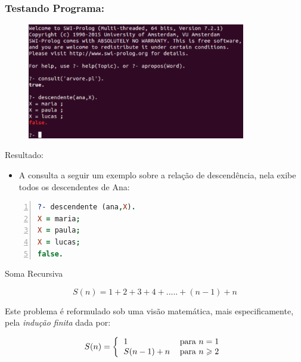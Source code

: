 \documentclass[sans]{beamer}
\begin{document}

\begin{frame}
\frametitle{Testando Programa:}

\begin{figure}[!htb]
\centering
\includegraphics[width=0.85\textwidth , height=0.65\textheight]{figuras/arvore.pdf}
\label{fig_recurs_3}
\end{figure}

\end{frame}

\begin{frame}[fragile]
\begin{block}{Resultado:}
\begin{itemize} 
\item A consulta a seguir um exemplo sobre a relação de descendência, nela exibe todos os descendentes de Ana:
\end{itemize}

\begin{lstlisting}[language=Prolog, 
                   basicstyle=\footnotesize\ttfamily,
                  backgroundcolor=\color{azulclaro}, 
                  keywordstyle=\color{red},   
                  keepspaces=true,    
                  keywordstyle=\color{magenta},
     numberstyle=\tiny\color{magenta},
     commentstyle=\color{green},             
    numbers=left,                    
    numbersep=5pt]
?- descendente (ana,X).
X = maria;
X = paula;
X = lucas;
false.
\end{lstlisting}
\end{block}
\end{frame}


\begin{frame}[fragile]
\begin{block}{Soma Recursiva}

\[
S(n)=1+2+3+4+.....+(n-1)+n
\]

Este problema é reformulado sob uma visão matemática, mais
especificamente, pela \textit{indução finita} dada por:


\[
S(n)=\left \{
\begin{tabular}
[c]{ll}
$1$ & para $n=1$ \\
$S(n-1) + n $ & para $n \geqslant 2$
\end{tabular}
\right.
\]


\end{block}
\end{frame}
\end{document}
